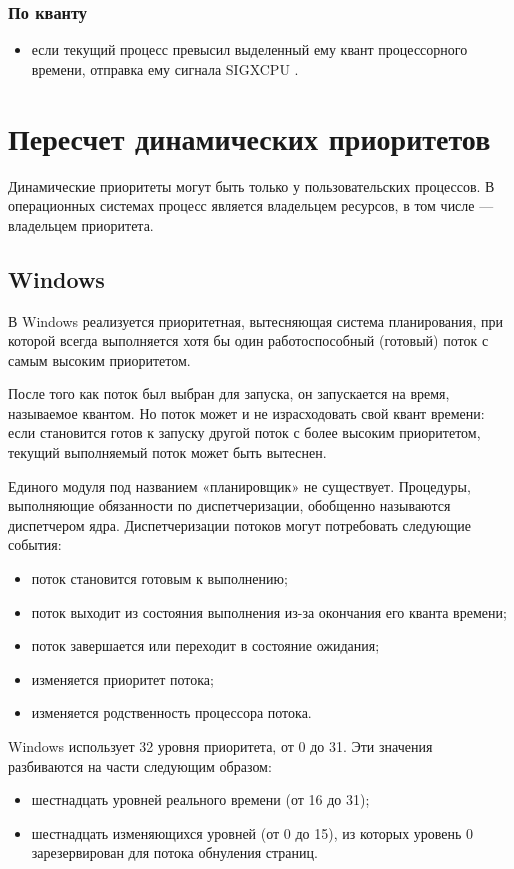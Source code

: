 \documentclass[a4paper,oneside,14pt]{extarticle}
\begin{document}
\subsubsection{По кванту}
\begin{itemize}
	\item если текущий процесс превысил выделенный ему квант процессорного времени, отправка ему сигнала SIGXCPU \cite[c.~188]{unix} \cite[c.~257]{unixrob}.
\end{itemize}

\section{Пересчет динамических приоритетов}

Динамические приоритеты могут быть только у пользовательских процессов. В операционных системах процесс является владельцем ресурсов, в том числе --- владельцем приоритета.

\subsection{Windows}
В Windows реализуется приоритетная, вытесняющая система планирования, при  которой всегда выполняется хотя бы один работоспособный (готовый) поток с самым высоким приоритетом. 

После того как поток был выбран для запуска, он запускается на время, называемое квантом.
Но поток может и не израсходовать свой квант времени: если становится готов к запуску другой поток с более высоким приоритетом, текущий выполняемый поток может быть вытеснен.

Единого модуля под названием «планировщик» не существует.
Процедуры, выполняющие обязанности по диспетчеризации, обобщенно называются диспетчером ядра.
Диспетчеризации потоков могут потребовать следующие события:
\begin{itemize}
	\item поток становится готовым к выполнению;
	\item поток выходит из состояния выполнения из-за окончания его кванта времени;
	\item поток завершается или переходит в состояние ожидания;
	\item изменяется приоритет потока;
	\item изменяется родственность процессора потока.
\end{itemize}

Windows использует 32 уровня приоритета, от 0 до 31. Эти значения  разбиваются на части следующим образом:
\begin{itemize}
	\item шестнадцать уровней реального времени (от 16 до 31);
	\item шестнадцать изменяющихся уровней (от 0 до 15), из которых уровень 0 зарезервирован для потока обнуления страниц. 
\end{itemize}
\end{document}
